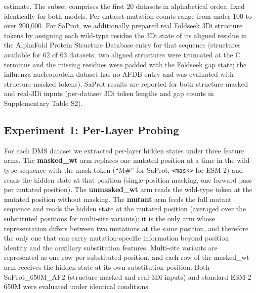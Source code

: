 \documentclass[numbered,webpdf,modern,large]{oup-authoring-template}
\newcommand{\rone}[1]{#1}
\newcommand{\rtwo}[1]{#1}
\newcommand{\rthree}[1]{#1}
\begin{document}
estimate. \rone{The subset comprises the first 20 datasets in alphabetical order,
fixed identically for both models.} Per-dataset mutation counts range from under 100 to over 200,000.
\rone{For SaProt, we additionally prepared real Foldseek 3Di structure tokens by
assigning each wild-type residue the 3Di state of its aligned residue in the
AlphaFold Protein Structure Database entry for that sequence (structures available for
62 of 63 datasets; two aligned structures were truncated at the C terminus and the
missing residues were padded with the Foldseek gap state; the influenza nucleoprotein
dataset has no AFDB entry and was evaluated with structure-masked tokens). SaProt
results are reported for both structure-masked and real-3Di inputs\rtwo{ (per-dataset
3Di token lengths and gap counts in Supplementary Table \rthree{S2})}.}

\subsection{Experiment 1: Per-Layer Probing}

\rone{For each DMS dataset we extracted per-layer hidden states under three feature
arms. The \textbf{masked\_wt} arm replaces \rtwo{one} mutated position \rtwo{at a time}
in the wild-type sequence with the mask token (``M\#'' for SaProt, \texttt{<mask>} for
ESM-2) and reads the hidden state at that position\rtwo{ (single-position masking, one
forward pass per mutated position)}. The
\textbf{unmasked\_wt} arm reads the wild-type token at the mutated position without
masking. The \textbf{mutant} arm feeds the full mutant sequence and reads the hidden
state at the mutated position\rtwo{ (averaged over the substituted positions for
multi-site variants)}; it is the only arm whose representation differs between
two mutations at the same position, and therefore the only one that can carry
mutation-specific information beyond position identity \rthree{and the auxiliary
substitution features}. \rtwo{Multi-site variants are
represented as one row per substituted position, and each row of the masked\_wt arm
receives the hidden state at its own substitution position.} Both SaProt\_650M\_AF2 (structure-masked
and real-3Di inputs) and standard ESM-2 650M were evaluated under identical conditions.}
\end{document}
